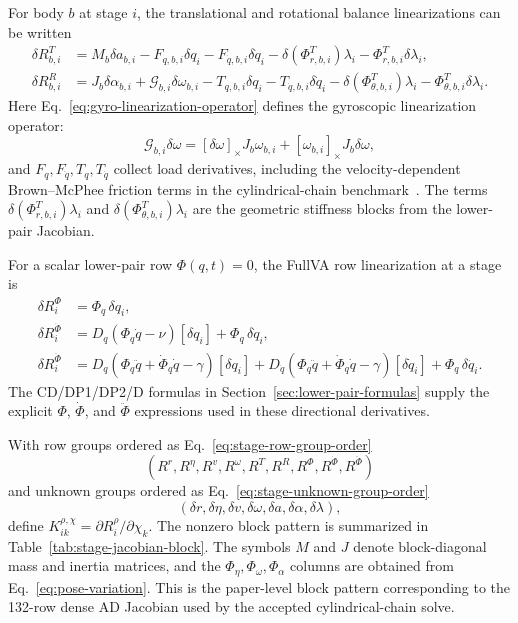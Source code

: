 \documentclass[preprint,12pt]{elsarticle}
\begin{document}
For body $b$ at stage $i$, the translational and rotational balance
linearizations can be written
\begin{align}
  \delta R^{T}_{b,i}
    &= M_b\delta a_{b,i}
       -F_{q,b,i}\delta q_i-F_{\dot q,b,i}\delta\dot q_i
       -\delta(\Phi_{r,b,i}^{T})\lambda_i
       -\Phi_{r,b,i}^{T}\delta\lambda_i,\\
  \delta R^{R}_{b,i}
    &= J_b\delta\alpha_{b,i}
       +\mathcal G_{b,i}\delta\omega_{b,i}
       -T_{q,b,i}\delta q_i-T_{\dot q,b,i}\delta\dot q_i
       -\delta(\Phi_{\theta,b,i}^{T})\lambda_i
       -\Phi_{\theta,b,i}^{T}\delta\lambda_i .
  \label{eq:balance-jacobian}
\end{align}
Here Eq.~\eqref{eq:gyro-linearization-operator} defines the gyroscopic
linearization operator:
\begin{equation}
\label{eq:gyro-linearization-operator}
  \mathcal G_{b,i}\delta\omega
  =[\delta\omega]_\times J_b\omega_{b,i}
   +[\omega_{b,i}]_\times J_b\delta\omega ,
\end{equation}
and $F_{q},F_{\dot q},T_q,T_{\dot q}$ collect load derivatives, including the
velocity-dependent Brown--McPhee friction terms in the cylindrical-chain
benchmark~\cite{browmcphee2016friction}. The terms
$\delta(\Phi_{r,b,i}^{T})\lambda_i$ and
$\delta(\Phi_{\theta,b,i}^{T})\lambda_i$ are the geometric stiffness blocks
from the lower-pair Jacobian.

For a scalar lower-pair row $\Phi(q,t)=0$, the FullVA row linearization at a
stage is
\begin{align}
  \delta R^\Phi_i
    &= \Phi_q\,\delta q_i,\\
  \delta R^{\dot\Phi}_i
    &= D_q(\Phi_q\dot q-\nu)[\delta q_i]
       +\Phi_q\,\delta\dot q_i,\\
  \delta R^{\ddot\Phi}_i
    &= D_q(\Phi_q\ddot q+\dot\Phi_q\dot q-\gamma)[\delta q_i]
       +D_{\dot q}(\Phi_q\ddot q+\dot\Phi_q\dot q-\gamma)
        [\delta\dot q_i]
       +\Phi_q\,\delta\ddot q_i .
  \label{eq:fullva-jacobian}
\end{align}
The CD/DP1/DP2/D formulas in Section~\ref{sec:lower-pair-formulas} supply the
explicit $\Phi$, $\dot\Phi$, and $\ddot\Phi$ expressions used in these
directional derivatives.

With row groups ordered as Eq.~\eqref{eq:stage-row-group-order}
\begin{equation}
\label{eq:stage-row-group-order}
  (R^r,R^\eta,R^v,R^\omega,R^T,R^R,R^\Phi,R^{\dot\Phi},R^{\ddot\Phi})
\end{equation}
and unknown groups ordered as Eq.~\eqref{eq:stage-unknown-group-order}
\begin{equation}
\label{eq:stage-unknown-group-order}
  (\delta r,\delta\eta,\delta v,\delta\omega,\delta a,\delta\alpha,
  \delta\lambda),
\end{equation}
define $K_{ik}^{\rho,\chi}=\partial R^\rho_i/\partial \chi_k$. The nonzero
block pattern is summarized in Table~\ref{tab:stage-jacobian-block}. The
symbols $M$ and $J$ denote block-diagonal mass and inertia matrices, and the
$\Phi_\eta,\Phi_\omega,\Phi_\alpha$ columns are obtained from
Eq.~\eqref{eq:pose-variation}. This is the paper-level block pattern
corresponding to the 132-row dense AD Jacobian used by the accepted
cylindrical-chain solve.
\end{document}
